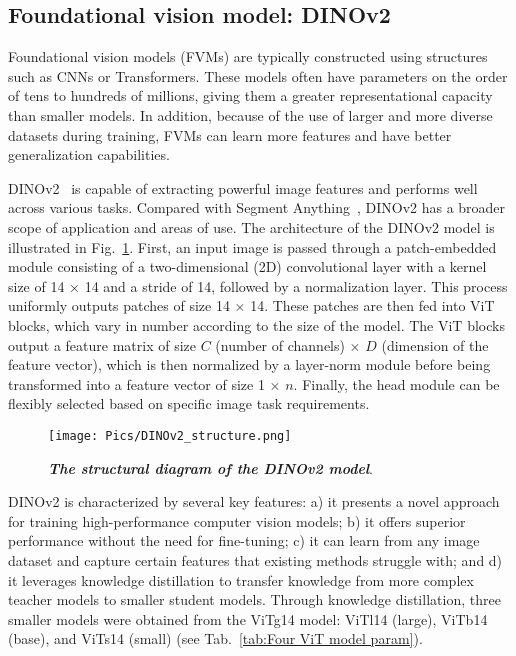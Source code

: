 \subsection{Foundational vision model: DINOv2}
\label{Large Vision Model:DINOv2}

Foundational vision models (FVMs) are typically constructed using structures such as CNNs or Transformers. These models often have parameters on the order of tens to hundreds of millions, giving them a greater representational capacity than smaller models. In addition, because of the use of larger and more diverse datasets during training, FVMs can learn more features and have better generalization capabilities.

DINOv2~\cite{oquab_dinov2_2023} is capable of extracting powerful image features and performs well across various tasks. Compared with Segment Anything~\cite{kirillov_segment_2023}, DINOv2 has a broader scope of application and areas of use. The architecture of the DINOv2 model is illustrated in Fig.~\ref{fig:dinov2_structure}. First, an input image is passed through a patch-embedded module consisting of a two-dimensional (2D) convolutional layer with a kernel size of 14 × 14 and a stride of 14, followed by a normalization layer. This process uniformly outputs patches of size 14 × 14. These patches are then fed into ViT blocks, which vary in number according to the size of the model. The ViT blocks output a feature matrix of size $C$ (number of channels) × $D$ (dimension of the feature vector), which is then normalized by a layer-norm module before being transformed into a feature vector of size 1 × $n$. Finally, the head module can be flexibly selected based on specific image task requirements.

\begin{figure}[!t]
\renewcommand{\thefigure}{3}    %
   \centering
   \texttt{[image: Pics/DINOv2\_structure.png]}
   \vspace{0em}
   \caption{\textbf{\emph{The structural diagram of the DINOv2 model}}. }
   \label{fig:dinov2_structure}
  \vspace{-1.5em}
\end{figure}

DINOv2 is characterized by several key features: a) it presents a novel approach for training high-performance computer vision models; b) it offers superior performance without the need for fine-tuning; c) it can learn from any image dataset and capture certain features that existing methods struggle with; and d) it leverages knowledge distillation to transfer knowledge from more complex teacher models to smaller student models. Through knowledge distillation, three smaller models were obtained from the ViTg14 model: ViTl14 (large), ViTb14 (base), and ViTs14 (small) (see Tab.~\ref{tab:Four ViT model param}).

